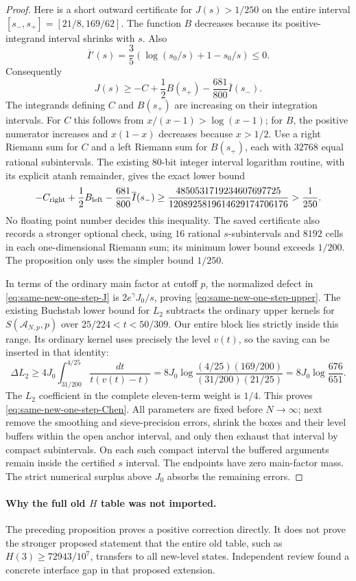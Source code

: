 \begin{proof}
Here is a short outward certificate for $J(s)>1/250$ on the entire
interval $[s_-,s_+]=[21/8,169/62]$. The function $B$ decreases because
its positive-integrand interval shrinks with $s$. Also
\[
 \overline I'(s)=\frac35\left(\log(s_0/s)+1-s_0/s\right)\le0.
\]
Consequently
\[
 J(s)\ge-C+\frac12B(s_+)-\frac{681}{800}\overline I(s_-).
\]
The integrands defining $C$ and $B(s_+)$ are increasing on their
integration intervals. For $C$ this follows from
$x/(x-1)>\log(x-1)$; for $B$, the positive numerator increases and
$x(1-x)$ decreases because $x>1/2$.
Use a right Riemann sum for $C$ and a left Riemann sum for $B(s_+)$,
each with $32768$ equal rational subintervals.
The existing $80$-bit integer interval logarithm routine, with its
explicit atanh remainder, gives the exact lower bound
\[
 -C_{\rm right}+\frac12B_{\rm left}
       -\frac{681}{800}\overline I(s_-)
 \ge
 \frac{4850531719234607697725}{1208925819614629174706176}
 >\frac1{250}.
\]
No floating point number decides this inequality. The saved certificate
also records a stronger optional check, using $16$ rational
$s$-subintervals and $8192$ cells in each one-dimensional Riemann sum;
its minimum lower bound exceeds $1/200$. The proposition only uses
the simpler bound $1/250$.

In terms of the ordinary main factor at cutoff $p$, the normalized
defect in \eqref{eq:same-new-one-step-J} is
$2e^\gamma J_0/s$, proving \eqref{eq:same-new-one-step-upper}.
The existing Buchstab lower bound for $L_2$ subtracts the ordinary
upper kernels for $S(\mathcal A_{N,p},p)$ over
$25/224<t<50/309$. Our entire block lies strictly inside this range.
Its ordinary kernel uses precisely the level $v(t)$, so the saving
can be inserted in that identity:
\[
 \Delta L_2\ge
 4J_0\int_{31/200}^{4/25}\frac{dt}{t(v(t)-t)}
 =8J_0\log\frac{(4/25)(169/200)}{(31/200)(21/25)}
 =8J_0\log\frac{676}{651}.
\]
The $L_2$ coefficient in the complete eleven-term weight is $1/4$.
This proves \eqref{eq:same-new-one-step-Chen}.
All parameters are fixed before $N\to\infty$; next remove the
smoothing and sieve-precision errors, shrink the boxes and their
level buffers within the open anchor interval, and only then exhaust
that interval by compact subintervals. On each such compact interval
the buffered arguments remain inside the certified $s$ interval.
The endpoints have zero main-factor mass. The strict numerical
surplus above $J_0$ absorbs the remaining errors.
\end{proof}

\paragraph{Why the full old $H$ table was not imported.}
The preceding proposition proves a positive correction directly.
It does not prove the stronger proposed statement that the entire
old table, such as $H(3)\ge72943/10^7$, transfers to all new-level
states. Independent review found a concrete interface gap in that
proposed extension.

